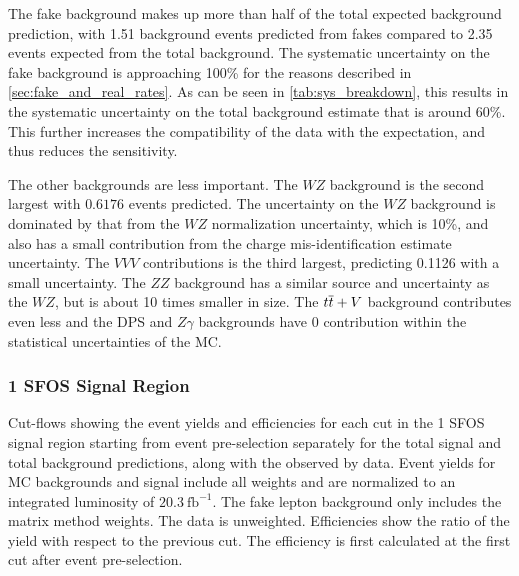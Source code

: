 The fake background makes up more than half of the total expected background
prediction, with 1.51 background events predicted from fakes compared to 
2.35 events expected from the total background.  The systematic
uncertainty on the fake background is approaching 100\% for the reasons
described in \sec\ref{sec:fake_and_real_rates}.
As can be seen in \tab\ref{tab:sys_breakdown}, this results in the
systematic uncertainty on the total background estimate 
that is around 60\%.
This further increases the compatibility 
of the data with the expectation, and  thus
reduces the sensitivity.

The other backgrounds are less important. The $WZ$ background
is the second largest
with $0.6176$ events predicted. The uncertainty on the $WZ$
background is dominated by that from the $WZ$ normalization uncertainty,
which is 10\%, and also has a small contribution from the 
charge mis-identification estimate uncertainty.
The $VVV$ contributions is the third largest, predicting 0.1126
with a small uncertainty.
The $ZZ$ background has a similar source and 
uncertainty as the $WZ$, but is about 10 times
smaller in size. The $t\overline{t}+V$ background contributes even less
and the DPS and $Z\gamma$ backgrounds have
0 contribution within the statistical uncertainties of the MC.


\FloatBarrier

\subsubsection{1 SFOS Signal Region}

\begin{table}[ht!]
\centering

\caption{Cut-flows showing the event yields and efficiencies for each cut in the 1 SFOS signal region
starting from event pre-selection separately for the total signal and total background predictions, along with the observed by data. 
Event yields for MC backgrounds and signal include all weights and are normalized to an integrated luminosity of $20.3~\mathrm{fb}^{-1}$.  
The fake lepton background only includes the matrix method weights.  The data is unweighted.
Efficiencies show the ratio of the yield with respect
to the previous cut.  The efficiency is first calculated at the first cut after event pre-selection.  }
\label{tab:cutflow_weighted_1sfos}
\end{table}

